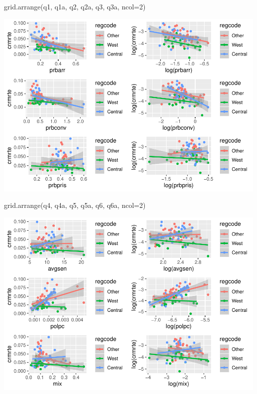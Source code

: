 \documentclass[]{article}
\newenvironment{Shaded}{}{}
\newcommand{\DataTypeTok}[1]{#1}
\newcommand{\DecValTok}[1]{#1}
\newcommand{\KeywordTok}[1]{\textcolor[rgb]{0.00,0.00,1.00}{#1}}
\newcommand{\NormalTok}[1]{#1}
\begin{document}
\begin{Shaded}
\begin{Highlighting}[]
\KeywordTok{grid.arrange}\NormalTok{(q1, q1a, q2, q2a, q3, q3a, }\DataTypeTok{ncol=}\DecValTok{2}\NormalTok{)}
\end{Highlighting}
\end{Shaded}

\includegraphics{Bagnard_Gaustad_Hartman_Leung_Lab_3_files/figure-latex/unnamed-chunk-94-1.pdf}

\begin{Shaded}
\begin{Highlighting}[]
\KeywordTok{grid.arrange}\NormalTok{(q4, q4a, q5, q5a, q6, q6a, }\DataTypeTok{ncol=}\DecValTok{2}\NormalTok{)}
\end{Highlighting}
\end{Shaded}

\includegraphics{Bagnard_Gaustad_Hartman_Leung_Lab_3_files/figure-latex/unnamed-chunk-94-2.pdf}
\end{document}
